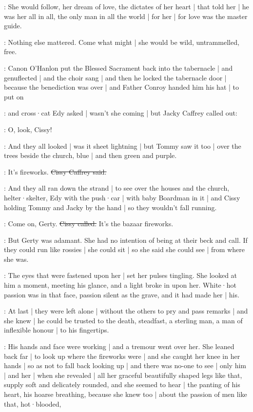 \gertyRomantic:
She would follow,
her dream of love,
the dictates of her heart |
that told her |
he was her all in all,
the only man in all the world |
for her |
for love was the master guide.

\gertySex:
Nothing else mattered.
Come what might |
she would be wild,
untrammelled,
free.

\Nrelig:
Canon O'Hanlon
put the Blessed Sacrament
back into the tabernacle |
and genuflected |
and the choir sang  |
and then he locked the tabernacle door |
because the benediction was over |
and Father Conroy handed him his hat |
to put on

:
and cross·cat Edy asked |
wasn't she coming |
but Jacky Caffrey called out:

\jacky:
O,
look,
Cissy!

:
And they all looked |
was it sheet lightning |%
but Tommy saw it too |
over the trees beside the church,
blue |
and then green
and purple.

\cissy:
It's fireworks.
\sout{Cissy Caffrey said.}

:
And they all ran down the strand |
to see over the houses
and the church,
helter·skelter,
Edy with the push·car |
with baby Boardman in it |
and Cissy holding Tommy and Jacky by the hand |
so they wouldn't fall running.

\cissy:
Come on,
Gerty.
\sout{Cissy called.}
It's the bazaar fireworks.

\gertyReal:
But Gerty was adamant.
She had no intention
of being at their beck and call.
If they could run like rossies |
she could sit |
so she said she could see |
from where she was.

\gertySex:
The eyes that were fastened upon her |
set her pulses tingling.%
She looked at him a moment,
meeting his glance,
and a light broke in upon her.
White·hot passion was in that face,
passion silent as the grave,
and it had made her |
his.

\gertyNovel:
At last |
they were left alone |
without the others to pry and pass remarks |
and she knew |
he could be trusted to the death,
steadfast,
a sterling man,
a man of inflexible honour |
to his fingertips.

\gertySex:
His hands and face were working |
and a tremour went over her.
She leaned back far |
to look up
where the fireworks were |
and she caught her knee in her hands |
so as not to fall back looking up |
and there was no-one to see |
only him |
and her |
when she revealed |
all her graceful beautifully shaped legs like that,
supply soft and delicately rounded,
and she seemed to hear |
the panting of his heart,
his hoarse breathing,%
because she knew too |
about the passion of men like that,
hot·blooded,

